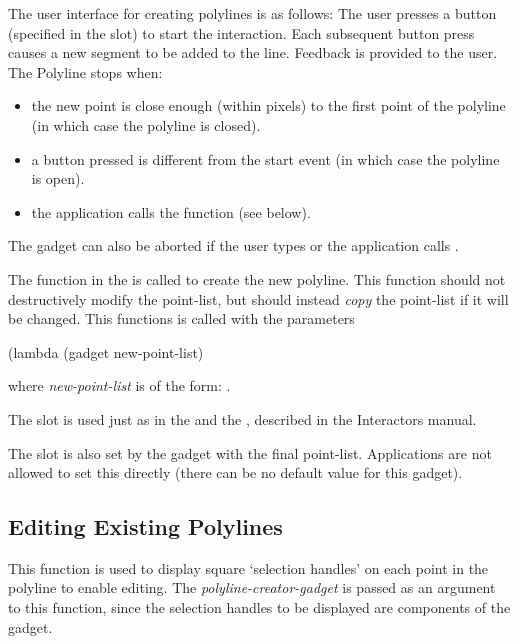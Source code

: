 The user interface for creating polylines is as follows:  The user presses a
button (specified in
the  slot) to start the interaction.  Each subsequent button
press causes a new segment to be added to the line.  Feedback is provided
to the user.  The Polyline stops when:
\begin{itemize}
\item the new point is close enough (within  pixels) to
the first point of the polyline (in which case the polyline is closed).

\item a button pressed is different from the start event (in which case the
polyline is open).

\item the application calls the function  (see below).
\end{itemize}

The gadget can also be aborted if the user types  or the
application calls .

The function in the  is called to create the new
polyline.  This function should not destructively modify the point-list,
but should instead {\it copy} the point-list if it will be changed.  This
functions is called with the parameters
\begin{programexample}
(lambda (gadget new-point-list)
\end{programexample}
where {\it new-point-list} is of the form: .

The  slot is used just as in the 
and the , described in the Interactors manual.

The  slot is also set by the gadget with the final point-list.
Applications are not allowed to set this directly (there can be no default
value for this gadget).


\subsection{Editing Existing Polylines}



This function is used to display square `selection handles' on each point in
the polyline to enable editing.  The {\it polyline-creator-gadget} is passed
as an argument to this function, since the selection handles to be displayed
are components of the gadget.

